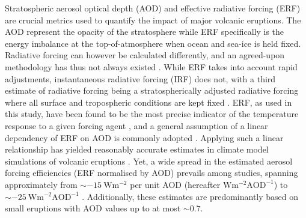 \documentclass[draft]{agujournal2019}
\begin{document}
  Stratospheric aerosol optical depth (AOD) and effective radiative forcing (ERF) are
  crucial metrics used to quantify the impact of major volcanic eruptions. The AOD
  represent the opacity of the stratosphere while ERF specifically is the energy
  imbalance at the top-of-atmosphere when ocean and sea-ice is held fixed. Radiative
  forcing can however be calculated differently, and an agreed-upon methodology has thus
  not always existed \cite{forster2016}. While ERF takes into account rapid adjustments,
  instantaneous radiative forcing (IRF) does not, with a third estimate of radiative
  forcing being a stratospherically adjusted radiative forcing where all surface and
  tropospheric conditions are kept fixed \cite{myhre2013,forster2016}. ERF, as used in
  this study, have been found to be the most precise indicator of the temperature
  response to a given forcing agent \cite{myhre2013,forster2016}, and a general
  assumption of a linear dependency of ERF on AOD is commonly adopted
  \cite{myhre2013,andersson2015}. Applying such a linear relationship has yielded
  reasonably accurate estimates in climate model simulations of volcanic eruptions
  \cite{mills2017,hansen2005,gregory2016,marshall2020,pitari2016b}. Yet, a wide spread
  in the estimated aerosol forcing efficiencies (ERF normalised by AOD) prevails among
  studies, spanning approximately from \(\sim \SI{-15}{\watt\metre^{-2}}\) per unit AOD
  (hereafter \(\si{\watt\metre^{-2}\mathrm{AOD}^{-1}}\)) \cite{pitari2016b} to
  \(\sim\SI{-25}{\watt\metre^{-2}\mathrm{AOD}^{-1}}\) \cite{hansen2005b}. Additionally,
  these estimates are predominantly based on small eruptions with AOD values up to at
  most \(\sim 0.7\).
\end{document}
